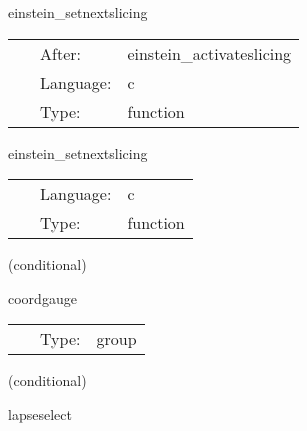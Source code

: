 \hspace{5mm} einstein\_setnextslicing 

\hspace{5mm}{\it identify the slicing for the next iteration } 


\hspace{5mm}

 \begin{tabular*}{160mm}{cll} 
~ & After:  & einstein\_activateslicing \\ 
~ & Language:  & c \\ 
~ & Type:  & function \\ 
\end{tabular*} 


\vspace{5mm}


\hspace{5mm} einstein\_setnextslicing 

\hspace{5mm}{\it identify the slicing for the next iteration } 


\hspace{5mm}

 \begin{tabular*}{160mm}{cll} 
~ & Language:  & c \\ 
~ & Type:  & function \\ 
\end{tabular*} 


\vspace{5mm}

   (conditional) 

\hspace{5mm} coordgauge 

\hspace{5mm}{\it coordinate gauge group } 


\hspace{5mm}

 \begin{tabular*}{160mm}{cll} 
~ & Type:  & group \\ 
\end{tabular*} 


\vspace{5mm}

   (conditional) 

\hspace{5mm} lapseselect 

\hspace{5mm}{\it lapse selection group } 


